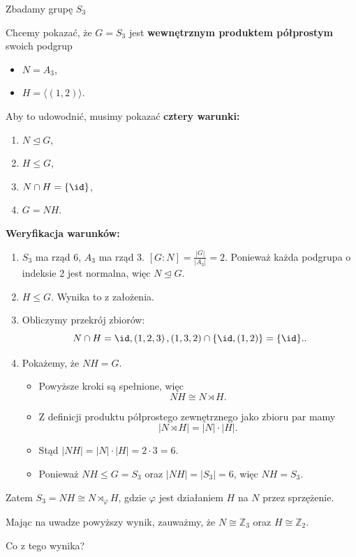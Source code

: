 \begin{eg}		
	Zbadamy grupę $S_3$
	\begin{goal}
		Chcemy pokazać, że $G = S_3$ jest  \textbf{wewnętrznym produktem półprostym} swoich podgrup 
		\begin{itemize}
			\item $N= A_3$,
			\item $H = \langle \left( 1,2 \right)  \rangle$.
		\end{itemize}
	
	\end{goal}
		Aby to udowodnić, musimy pokazać \textbf{cztery warunki:}
	\begin{enumerate}[label=\textbf{\arabic*.}]
		\item $N\unlhd G$,
		\item $H\le G$,
		\item $N \cap H = \{ \id\} $,
		\item $G = NH$.
	\end{enumerate}

	\textbf{Weryfikacja warunków:} 
\begin{enumerate}[label=\textbf{Warunek \arabic*.}, wide]
		\item $S_3$ ma rząd 6, $A_3$ ma rząd 3. $\left[ G:N \right] = \frac{\left| G \right| }{\left| A_{3} \right| } = 2$. Ponieważ każda podgrupa o indeksie 2 jest normalna, więc  $N\unlhd G$.
		\item $H\le G$. Wynika to z założenia.
		\item Obliczymy przekrój zbiorów: \[
				N \cap H = {\id, \left( 1,2,3 \right), \left( 1,3,2 \right) } \cap \{\id, \left( 1,2 \right) \} = \{ \id\}.
		.\] 
		\item Pokażemy, że $NH = G$.
			\begin{itemize}[leftmargin=3.5em]
				\item Powyższe kroki są spełnione, więc \[
				NH \cong N\rtimes H
				.\] 
			\item Z definicji produktu półprostego zewnętrznego jako zbioru par mamy
				\[
				\left| N\rtimes H \right| = \left| N \right| \cdot \left| H \right| 
				.\] 
			\item Stąd $\left| NH \right| = \left| N \right| \cdot \left| H \right| = 2 \cdot 3 = 6$.
			\item Ponieważ $NH \le G=S_3$ oraz $\left| NH \right| = \left| S_3 \right| = 6$, więc $NH = S_3$.
			\end{itemize}
	\end{enumerate}
	
	Zatem $S_3 = NH \cong N\rtimes_{\varphi}H$, gdzie $\varphi$ jest działaniem $H$ na $N$ przez sprzężenie.
\end{eg}
\begin{remark}
	Mając na uwadze powyższy wynik, zauważmy, że $N\cong \mathbb{Z}_3$ oraz $H \cong\mathbb{Z}_2$. 
\end{remark}
\begin{question}
	Co z tego wynika?
\end{question}

